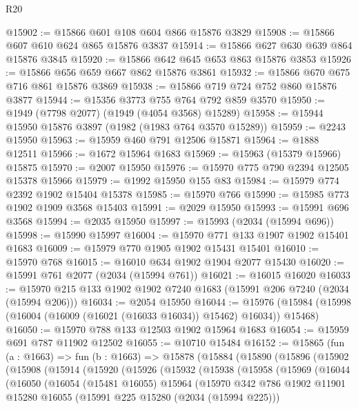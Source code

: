 \begin{lexlean}{R20}
\begin{coremodule}
@15902 := @15866 @601 @108 @604 @866 @15876 @3829
@15908 := @15866 @607 @610 @624 @865 @15876 @3837
@15914 := @15866 @627 @630 @639 @864 @15876 @3845
@15920 := @15866 @642 @645 @653 @863 @15876 @3853
@15926 := @15866 @656 @659 @667 @862 @15876 @3861
@15932 := @15866 @670 @675 @716 @861 @15876 @3869
@15938 := @15866 @719 @724 @752 @860 @15876 @3877
@15944 := @15356 @3773 @755 @764 @792 @859 @3570
@15950 := @1949 (@7798 @2077) (@1949 (@4054 @3568) @15289)
@15958 := @15944 @15950 @15876 @3897 (@1982 (@1983 @764 @3570 @15289))
@15959 := @2243 @15950
@15963 := @15959 @460 @791 @12506 @15871
@15964 := @1888 @12511
@15966 := @1672 @15964 @1683
@15969 := @15963 (@15379 @15966) @15875
@15970 := @2007 @15950
@15976 := @15970 @775 @790 @2394 @12505 @15378 @15966
@15979 := @1992 @15950 @155 @83
@15984 := @15979 @774 @2392 @1902 @15404 @15378
@15985 := @15970 @766
@15990 := @15985 @773 @1902 @1909 @3568 @15403
@15991 := @2029 @15950
@15993 := @15991 @696 @3568
@15994 := @2035 @15950
@15997 := @15993 (@2034 (@15994 @696))
@15998 := @15990 @15997
@16004 := @15970 @771 @133 @1907 @1902 @15401 @1683
@16009 := @15979 @770 @1905 @1902 @15431 @15401
@16010 := @15970 @768
@16015 := @16010 @634 @1902 @1904 @2077 @15430
@16020 := @15991 @761 @2077 (@2034 (@15994 @761))
@16021 := @16015 @16020
@16033 := @15970 @215 @133 @1902 @1902 @7240 @1683 (@15991 @206 @7240 (@2034 (@15994 @206)))
@16034 := @2054 @15950
@16044 := @15976 (@15984 (@15998 (@16004 (@16009 (@16021 (@16033 @16034)) @15462) @16034)) @15468)
@16050 := @15970 @788 @133 @12503 @1902 @15964 @1683
@16054 := @15959 @691 @787 @11902 @12502
@16055 := @10710 @15484
@16152 := @15865
    (fun (a : @1663) =>
    fun (b : @1663) =>
    @15878
      (@15884
        (@15890
          (@15896
            (@15902
              (@15908
                (@15914
                  (@15920
                    (@15926
                      (@15932
                        (@15938
                          (@15958
                            (@15969
                              (@16044
                                (@16050
                                  (@16054
                                    (@15481 @16055)
                                    @15964
                                    (@15970
                                      @342
                                      @786
                                      @1902
                                      @11901
                                      @15280
                                      @16055
                                      (@15991 @225 @15280 (@2034 (@15994 @225)))

\end{coremodule}
\end{lexlean}
